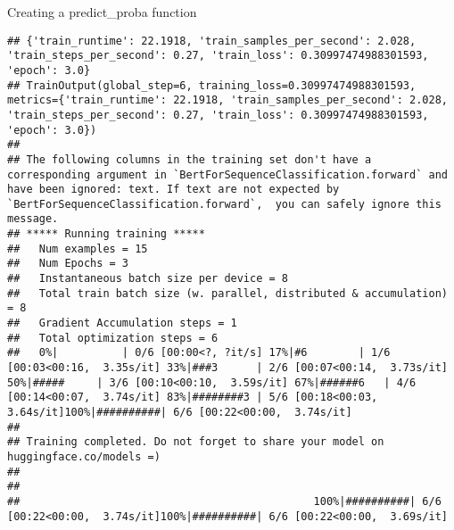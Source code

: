 \documentclass[
  10pt,
  ignorenonframetext,
  aspectratio=169]{beamer}
\begin{document}
\begin{frame}[fragile]{Creating a predict\_proba function}
\begin{verbatim}
## {'train_runtime': 22.1918, 'train_samples_per_second': 2.028, 'train_steps_per_second': 0.27, 'train_loss': 0.30997474988301593, 'epoch': 3.0}
## TrainOutput(global_step=6, training_loss=0.30997474988301593, metrics={'train_runtime': 22.1918, 'train_samples_per_second': 2.028, 'train_steps_per_second': 0.27, 'train_loss': 0.30997474988301593, 'epoch': 3.0})
## 
## The following columns in the training set don't have a corresponding argument in `BertForSequenceClassification.forward` and have been ignored: text. If text are not expected by `BertForSequenceClassification.forward`,  you can safely ignore this message.
## ***** Running training *****
##   Num examples = 15
##   Num Epochs = 3
##   Instantaneous batch size per device = 8
##   Total train batch size (w. parallel, distributed & accumulation) = 8
##   Gradient Accumulation steps = 1
##   Total optimization steps = 6
##   0%|          | 0/6 [00:00<?, ?it/s] 17%|#6        | 1/6 [00:03<00:16,  3.35s/it] 33%|###3      | 2/6 [00:07<00:14,  3.73s/it] 50%|#####     | 3/6 [00:10<00:10,  3.59s/it] 67%|######6   | 4/6 [00:14<00:07,  3.74s/it] 83%|########3 | 5/6 [00:18<00:03,  3.64s/it]100%|##########| 6/6 [00:22<00:00,  3.74s/it]
## 
## Training completed. Do not forget to share your model on huggingface.co/models =)
## 
## 
##                                              100%|##########| 6/6 [00:22<00:00,  3.74s/it]100%|##########| 6/6 [00:22<00:00,  3.69s/it]
\end{verbatim}
\end{frame}
\end{document}
